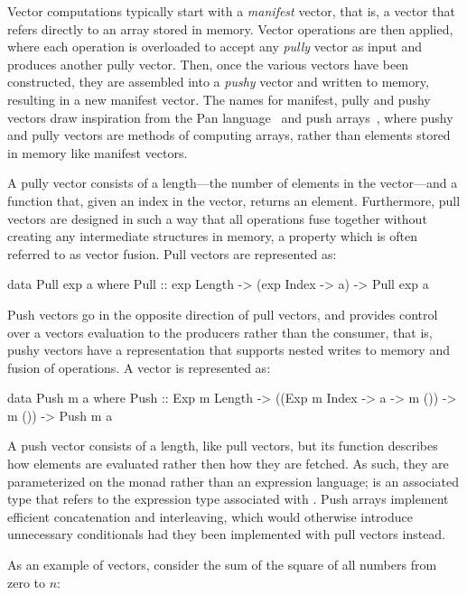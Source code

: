 \documentclass[../paper.tex]{subfiles}
\begin{document}
Vector computations typically start with a \textit{manifest} vector, that is, a vector that refers directly to an array stored in memory. Vector operations are then applied, where each operation is overloaded to accept any \textit{pully} vector as input and produces another pully vector. Then, once the various vectors have been constructed, they are assembled into a \textit{pushy} vector and written to memory, resulting in a new manifest vector. The names for manifest, pully and pushy vectors draw inspiration from the Pan language~\cite{elliott2003} and push arrays~\cite{claessen2012}, where pushy and pully vectors are methods of computing arrays, rather than elements stored in memory like manifest vectors.

A pully vector consists of a length---the number of elements in the vector---and a function that, given an index in the vector, returns an element. Furthermore, pull vectors are designed in such a way that all operations fuse together without creating any intermediate structures in memory, a property which is often referred to as vector fusion. Pull vectors are represented as:

\begin{code}
data Pull exp a where
  Pull :: exp Length -> (exp Index -> a) -> Pull exp a
\end{code}

Push vectors go in the opposite direction of pull vectors, and provides control over a vectors evaluation to the producers rather than the consumer, that is, pushy vectors have a representation that supports nested writes to memory and fusion of operations. A  vector is represented as:

\begin{code}
data Push m a where
  Push :: Exp m Length -> ((Exp m Index -> a -> m ()) -> m ()) -> Push m a
\end{code}

\noindent A push vector consists of a length, like pull vectors, but its function describes how elements are evaluated rather then how they are fetched. As such, they are parameterized on the monad  rather than an expression language;  is an associated type that refers to the expression type associated with . Push arrays implement efficient concatenation and interleaving, which would otherwise introduce unnecessary conditionals had they been implemented with pull vectors instead.

As an example of vectors, consider the sum of the square of all numbers from zero to $n$:
\end{document}
